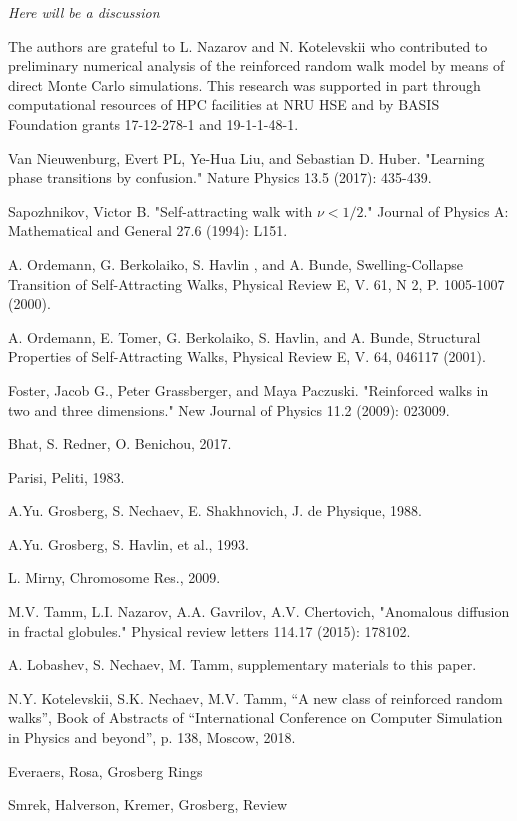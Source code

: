 \documentclass[aps,a4paper,twocolumn,showpacs]{revtex4}
\begin{document}
{\it Here will be a discussion}

The authors are grateful to L. Nazarov and N. Kotelevskii who contributed to preliminary numerical analysis of the reinforced random walk model by means of direct Monte Carlo simulations. This research was supported in part through computational resources of HPC facilities at
NRU HSE and by BASIS Foundation grants 17-12-278-1 and 19-1-1-48-1.

\begin{thebibliography}{99}

 Van Nieuwenburg, Evert PL, Ye-Hua Liu, and Sebastian D. Huber. "Learning phase transitions by confusion." Nature Physics 13.5 (2017): 435-439.

 Sapozhnikov, Victor B. "Self-attracting walk with $\nu< 1/2$." Journal of Physics A: Mathematical and General 27.6 (1994): L151.

 A. Ordemann, G. Berkolaiko, S. Havlin , and A. Bunde, Swelling-Collapse Transition of Self-Attracting Walks, Physical Review E, V. 61, N 2, P. 1005-1007 (2000).

 A. Ordemann, E. Tomer, G. Berkolaiko, S. Havlin, and A. Bunde, Structural Properties of Self-Attracting Walks, Physical Review E, V. 64, 046117 (2001).

 Foster, Jacob G., Peter Grassberger, and Maya Paczuski. "Reinforced walks in two and three dimensions." New Journal of Physics 11.2 (2009): 023009.

 Bhat, S. Redner, O. Benichou, 2017.

 Parisi, Peliti, 1983.

 A.Yu. Grosberg, S. Nechaev, E. Shakhnovich, J. de Physique, 1988.

 A.Yu. Grosberg, S. Havlin, et al., 1993.

 L. Mirny, Chromosome Res., 2009.

 M.V. Tamm, L.I. Nazarov, A.A. Gavrilov, A.V. Chertovich, "Anomalous diffusion in fractal globules." Physical review letters 114.17 (2015): 178102.

 A. Lobashev, S. Nechaev, M. Tamm, supplementary materials to this paper.

 N.Y. Kotelevskii, S.K. Nechaev, M.V. Tamm, ``A new class of reinforced random walks'', Book of Abstracts of ``International Conference on Computer Simulation in Physics and beyond'', p. 138, Moscow, 2018. 

 Everaers,  Rosa, Grosberg  Rings

 Smrek, Halverson, Kremer, Grosberg, Review

\end{thebibliography}
\end{document}

